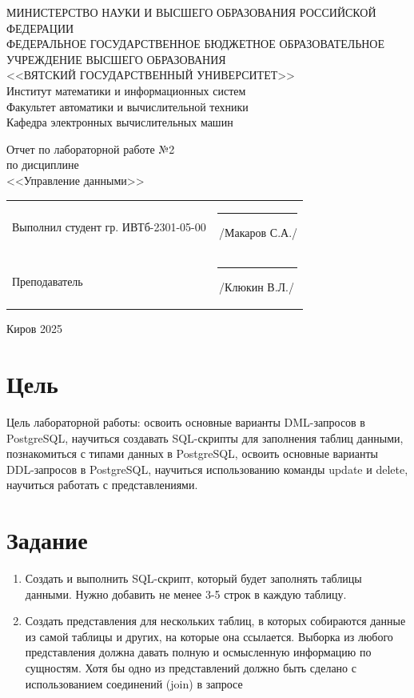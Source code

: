 \documentclass[a4paper,14pt]{extarticle}
\begin{document}
  \newpage\thispagestyle{empty}
  \begin{center}
    \MakeUppercase{
      Министерство науки и высшего образования Российской Федерации\\
      Федеральное государственное бюджетное образовательное учреждение высшего образования\\
      <<Вятский Государственный Университет>>\\
    }
    Институт математики и информационных систем\\
    Факультет автоматики и вычислительной техники\\
    Кафедра электронных вычислительных машин
  \end{center}
  \vfill

  \begin{center}
    Отчет по лабораторной работе №2\\
    по дисциплине\\
    <<Управление данными>>\\
  \end{center}
  \vfill

  \noindent
  \begin{tabular}{ll}
    Выполнил студент гр. ИВТб-2301-05-00 \hspace{5mm} &
    \rule[-1mm]{25mm}{0.10mm}\,/Макаров С.А./\\
    
    Преподаватель & \rule[-1mm]{25mm}{0.10mm}\,/Клюкин В.Л./\\
  \end{tabular}

  \vfill
  \begin{center}
    Киров 2025
  \end{center}

  \newpage
  \section*{Цель}
  Цель лабораторной работы: освоить основные варианты DML-запросов в PostgreSQL, научиться создавать SQL-скрипты для заполнения таблиц данными, познакомиться с типами данных в PostgreSQL, освоить основные варианты DDL-запросов в PostgreSQL, научиться использованию команды update и delete, научиться работать с представлениями.

  \section*{Задание}
  \begin{enumerate}
    \item Создать и выполнить SQL-скрипт, который будет заполнять таблицы данными. Нужно добавить не менее 3-5 строк в каждую таблицу.
    \item Создать представления для нескольких таблиц, в которых собираются данные из самой таблицы и других, на которые она ссылается. Выборка из любого представления должна давать полную и осмысленную информацию по сущностям. Хотя бы одно из представлений должно быть сделано с использованием соединений (join) в запросе
  \end{enumerate}
\end{document}
